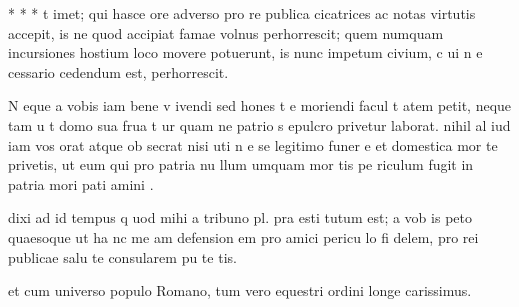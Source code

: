  * * * t imet; qui hasce ore adverso pro re publica cicatrices ac notas virtutis accepit, is ne quod accipiat famae volnus perhorrescit; quem numquam incursiones hostium loco movere potuerunt, is nunc impetum civium, c ui n e cessario cedendum est, perhorrescit.

 N eque a vobis iam bene v ivendi sed hones t e moriendi facul t atem petit, neque tam u t domo sua frua t ur quam ne patrio s epulcro privetur laborat. nihil al iud iam vos orat atque ob secrat nisi uti n e se legitimo funer e et domestica mor te privetis, ut eum qui pro patria nu llum umquam mor tis pe riculum fugit in patria mori pati amini .

 dixi ad id tempus q uod mihi a tribuno pl. pra esti tutum est; a vob is peto quaesoque ut ha nc me am defension em pro amici pericu lo fi delem, pro rei publicae salu te consularem pu te tis.

 et cum universo populo Romano, tum vero equestri ordini longe carissimus.
